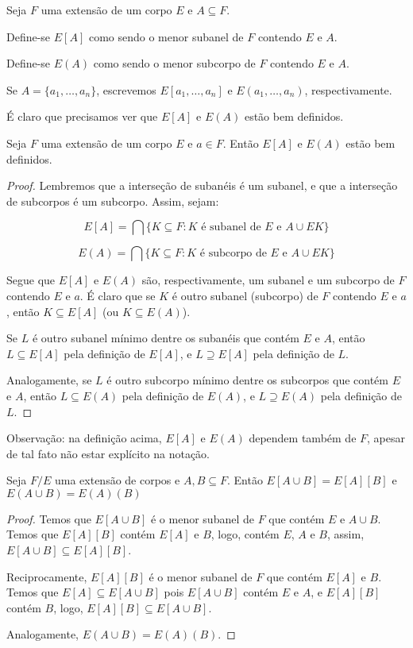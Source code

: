 \begin{definition}
    Seja $F$ uma extensão de um corpo $E$ e $A \subseteq F$.

    Define-se $E[A]$ como sendo o menor subanel de $F$ contendo $E$ e $A$.

    Define-se $E(A)$ como sendo o menor subcorpo de $F$ contendo $E$ e $A$.

    Se $A=\{a_1, \dots, a_n\}$, escrevemos $E[a_1, \dots, a_n]$ e $E(a_1, \dots, a_n)$, respectivamente.
\end{definition}

É claro que precisamos ver que $E[A]$ e $E(A)$ estão bem definidos.

\begin{lemma}
    Seja $F$ uma extensão de um corpo $E$ e $a \in F$. Então $E[A]$ e $E(A)$ estão bem definidos.
\end{lemma}

\begin{proof}
    Lembremos que a interseção de subanéis é um subanel, e que a interseção de subcorpos é um subcorpo. Assim, sejam:

    \[E[A]=\bigcap\{K\subseteq F: K \text{ é subanel de } E \text{ e } A\cup E K\}\]

    \[E(A)=\bigcap\{K\subseteq F: K \text{ é subcorpo de } E \text{ e } A\cup E K\}\]

    Segue que $E[A]$ e $E(A)$ são, respectivamente, um subanel e um subcorpo de $F$ contendo $E$ e $a$.
    É claro que se $K$ é outro subanel (subcorpo) de $F$ contendo $E$ e $a$, então $K\subseteq E[A]$ (ou $K\subseteq E(A)$). 

    Se $L$ é outro subanel mínimo dentre os subanéis que contém $E$ e $A$, então $L\subseteq E[A]$ pela definição de $E[A]$, e $L\supseteq E[A]$ pela definição de $L$.

    Analogamente, se $L$ é outro subcorpo mínimo dentre os subcorpos que contém $E$ e $A$, então $L\subseteq E(A)$ pela definição de $E(A)$, e $L\supseteq E(A)$ pela definição de $L$.
\end{proof}
Observação: na definição acima, $E[A]$ e $E(A)$ dependem também de $F$, apesar de tal fato não estar explícito na notação.
\begin{lemma}
Seja $F/E$ uma extensão de corpos e $A, B \subseteq F$. Então $E[A\cup B]=E[A][B]$ e $E(A\cup B)=E(A)(B)$
\end{lemma}
\begin{proof}
    Temos que $E[A\cup B]$ é o menor subanel de $F$ que contém $E$ e $A\cup B$. Temos que $E[A][B]$ contém $E[A]$ e $B$, logo, contém $E$, $A$ e $B$, assim, $E[A\cup B]\subseteq E[A][B]$.

    Reciprocamente, $E[A][B]$ é o menor subanel de $F$ que contém $E[A]$ e $B$. Temos que $E[A]\subseteq E[A\cup B]$ pois $E[A\cup B]$ contém $E$ e $A$, e $E[A][B]$ contém $B$, logo, $E[A][B]\subseteq E[A\cup B]$.

    Analogamente, $E(A\cup B)=E(A)(B)$.
\end{proof}

